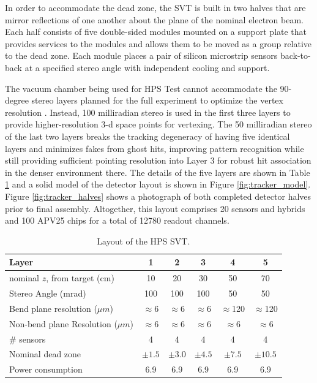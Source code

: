 In order to accommodate the dead zone, the SVT is built in two halves that are mirror reflections of one another about the plane of the nominal electron beam.  Each half consists of five double-sided modules mounted on a support plate that provides services to the modules and allows them to be moved as a group relative to the dead zone. Each module places a pair of silicon microstrip sensors back-to-back at a specified stereo angle with independent cooling and support.

The vacuum chamber being used for HPS Test cannot accommodate the 90-degree stereo layers planned for the full experiment to optimize the vertex resolution \cite{HPS_PROP}. Instead, 100 milliradian stereo is used in the first three layers to provide higher-resolution 3-d space points for vertexing. The 50 milliradian stereo of the last two layers breaks the tracking degeneracy of having five identical layers and minimizes fakes from ghost hits, improving pattern recognition while still providing sufficient pointing resolution into Layer 3 for robust hit association in the denser environment there. The details of the five layers are shown in Table \ref{tab:trk} and a solid model of the detector layout is shown in Figure \ref{fig:tracker_model}.  Figure \ref{fig:tracker_halves} shows a photograph of both completed detector halves prior to final assembly.  Altogether, this layout comprises 20 sensors and hybrids and 100 APV25 chips for a total of 12780 readout channels. 

\begin{table}[h]
\begin{center}
\begin{tabular}{lccccc}   
\hline \hline 
    Layer & 1 & 2 & 3 & 4 & 5 \\      
\hline
    nominal $z$, from target (cm)  & 10 & 20 & 30 & 50 & 70  \\ 
    Stereo Angle (mrad)  & 100 & 100 & 100 & 50 & 50 \\ 
    Bend plane resolution ($\mu m$)  & $\approx$6 & $\approx$6 & $\approx$6 & $\approx$120 & $\approx$120  \\ 
    Non-bend plane Resolution ($\mu m$)  & $\approx$6 & $\approx$6 & $\approx$6 & $\approx$6 & $\approx$6  \\ 
    \# sensors  & 4 & 4 & 4 & 4 & 4  \\ 
    Nominal dead zone  & $\pm1.5$  & $\pm3.0$  & $\pm4.5$  & $\pm7.5$  & $\pm10.5$  \\ 
    Power consumption & 6.9 & 6.9 & 6.9 & 6.9 & 6.9 \\
\hline \hline
\end{tabular}
\caption[]{Layout of the HPS SVT. }
\label{tab:trk} 
\end{center}
\end{table}

